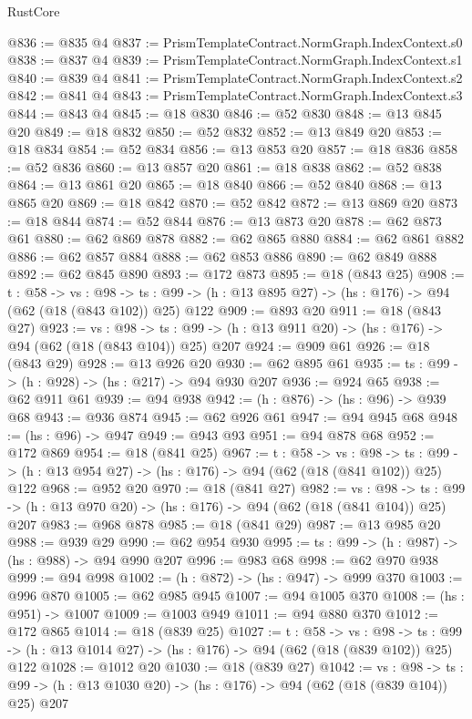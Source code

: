 \begin{lexlean}{RustCore}
\begin{coremodule}
@836 := @835 @4
@837 := PrismTemplateContract.NormGraph.IndexContext.s0
@838 := @837 @4
@839 := PrismTemplateContract.NormGraph.IndexContext.s1
@840 := @839 @4
@841 := PrismTemplateContract.NormGraph.IndexContext.s2
@842 := @841 @4
@843 := PrismTemplateContract.NormGraph.IndexContext.s3
@844 := @843 @4
@845 := @18 @830
@846 := @52 @830
@848 := @13 @845 @20
@849 := @18 @832
@850 := @52 @832
@852 := @13 @849 @20
@853 := @18 @834
@854 := @52 @834
@856 := @13 @853 @20
@857 := @18 @836
@858 := @52 @836
@860 := @13 @857 @20
@861 := @18 @838
@862 := @52 @838
@864 := @13 @861 @20
@865 := @18 @840
@866 := @52 @840
@868 := @13 @865 @20
@869 := @18 @842
@870 := @52 @842
@872 := @13 @869 @20
@873 := @18 @844
@874 := @52 @844
@876 := @13 @873 @20
@878 := @62 @873 @61
@880 := @62 @869 @878
@882 := @62 @865 @880
@884 := @62 @861 @882
@886 := @62 @857 @884
@888 := @62 @853 @886
@890 := @62 @849 @888
@892 := @62 @845 @890
@893 := @172 @873
@895 := @18 (@843 @25)
@908 := {t : @58} ->
  {vs : @98} ->
  {ts : @99} -> (h : @13 @895 @27) -> (hs : @176) -> @94 (@62 (@18 (@843 @102)) @25) @122
@909 := @893 @20
@911 := @18 (@843 @27)
@923 := {vs : @98} ->
  {ts : @99} -> (h : @13 @911 @20) -> (hs : @176) -> @94 (@62 (@18 (@843 @104)) @25) @207
@924 := @909 @61
@926 := @18 (@843 @29)
@928 := @13 @926 @20
@930 := @62 @895 @61
@935 := {ts : @99} -> (h : @928) -> (hs : @217) -> @94 @930 @207
@936 := @924 @65
@938 := @62 @911 @61
@939 := @94 @938
@942 := (h : @876) -> (hs : @96) -> @939 @68
@943 := @936 @874
@945 := @62 @926 @61
@947 := @94 @945 @68
@948 := (hs : @96) -> @947
@949 := @943 @93
@951 := @94 @878 @68
@952 := @172 @869
@954 := @18 (@841 @25)
@967 := {t : @58} ->
  {vs : @98} ->
  {ts : @99} -> (h : @13 @954 @27) -> (hs : @176) -> @94 (@62 (@18 (@841 @102)) @25) @122
@968 := @952 @20
@970 := @18 (@841 @27)
@982 := {vs : @98} ->
  {ts : @99} -> (h : @13 @970 @20) -> (hs : @176) -> @94 (@62 (@18 (@841 @104)) @25) @207
@983 := @968 @878
@985 := @18 (@841 @29)
@987 := @13 @985 @20
@988 := @939 @29
@990 := @62 @954 @930
@995 := {ts : @99} -> (h : @987) -> (hs : @988) -> @94 @990 @207
@996 := @983 @68
@998 := @62 @970 @938
@999 := @94 @998
@1002 := (h : @872) -> (hs : @947) -> @999 @370
@1003 := @996 @870
@1005 := @62 @985 @945
@1007 := @94 @1005 @370
@1008 := (hs : @951) -> @1007
@1009 := @1003 @949
@1011 := @94 @880 @370
@1012 := @172 @865
@1014 := @18 (@839 @25)
@1027 := {t : @58} ->
  {vs : @98} ->
  {ts : @99} -> (h : @13 @1014 @27) -> (hs : @176) -> @94 (@62 (@18 (@839 @102)) @25) @122
@1028 := @1012 @20
@1030 := @18 (@839 @27)
@1042 := {vs : @98} ->
  {ts : @99} -> (h : @13 @1030 @20) -> (hs : @176) -> @94 (@62 (@18 (@839 @104)) @25) @207

\end{coremodule}
\end{lexlean}

